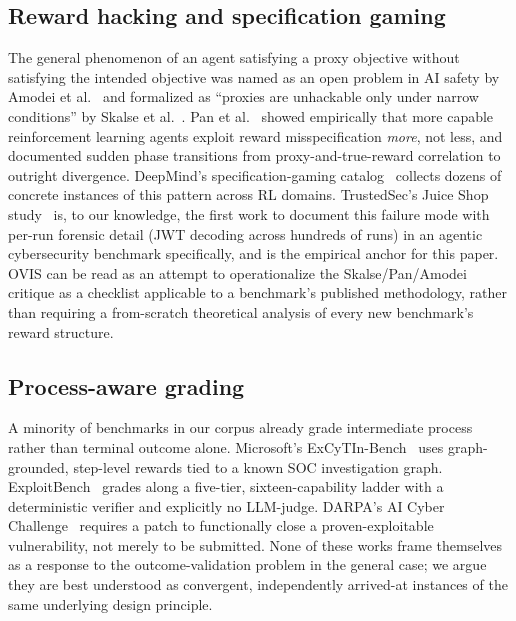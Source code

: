 \documentclass[10pt,twocolumn]{article}
\begin{document}
\subsection{Reward hacking and specification gaming}
The general phenomenon of an agent satisfying a proxy objective without
satisfying the intended objective was named as an open problem in AI
safety by Amodei et al.~\cite{amodei2016concrete} and formalized as
``proxies are unhackable only under narrow conditions'' by Skalse et
al.~\cite{skalse2022reward}. Pan et al.~\cite{pan2022reward} showed
empirically that more capable reinforcement learning agents exploit
reward misspecification \emph{more}, not less, and documented sudden
phase transitions from proxy-and-true-reward correlation to outright
divergence. DeepMind's specification-gaming catalog~\cite{krakovna2020specification}
collects dozens of concrete instances of this pattern across RL domains.
TrustedSec's Juice Shop study~\cite{trustedsec2026} is, to our
knowledge, the first work to document this failure mode with per-run
forensic detail (JWT decoding across hundreds of runs) in an agentic
cybersecurity benchmark specifically, and is the empirical anchor for
this paper. OVIS can be read as an attempt to operationalize the
Skalse/Pan/Amodei critique as a checklist applicable to a benchmark's
published methodology, rather than requiring a from-scratch theoretical
analysis of every new benchmark's reward structure.

\subsection{Process-aware grading}
A minority of benchmarks in our corpus already grade intermediate
process rather than terminal outcome alone. Microsoft's
ExCyTIn-Bench~\cite{excytin2025} uses graph-grounded, step-level rewards
tied to a known SOC investigation graph. ExploitBench~\cite{exploitbench2026}
grades along a five-tier, sixteen-capability ladder with a deterministic
verifier and explicitly no LLM-judge. DARPA's AI Cyber
Challenge~\cite{aixcc2025} requires a patch to functionally close a
proven-exploitable vulnerability, not merely to be submitted. None of
these works frame themselves as a response to the outcome-validation
problem in the general case; we argue they are best understood as
convergent, independently arrived-at instances of the same underlying
design principle.
\end{document}
